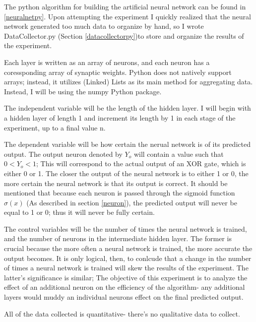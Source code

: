 \documentclass[12pt]{article}
\begin{document}
        The python algorithm for building the artificial neural network can be found in \ref{neuralnetpy}. Upon attempting the experiment I quickly realized that the neural network generated too much data to organize by hand, so I wrote DataCollector.py (Section \ref{datacollectorpy})to store and organize the results of the experiment.
        
        Each layer is written as an array of neurons, and each neuron has a coressponding array of synaptic weights. Python does not natively support arrays; instead, it utilizes (Linked) Lists as its main method for aggregating data. Instead, I will be using the numpy Python package.

        The independent variable will be the length of the hidden layer. I will begin with a hidden layer of length 1 and increment its length by 1 in each stage of the experiment, up to a final value n.
        
        The dependent variable will be how certain the nerual network is of its predicted output. The output neuron denoted by \({Y_o}\) will contain a value such that \(0 < Y_o < 1\); This will correspond to the actual output of an XOR gate, which is either 0 or 1. The closer the output of the neural network is to either 1 or 0, the more certain the neural network is that its output is correct. It should be mentioned that because each neuron is passed through the sigmoid function \(\sigma(x)\) (As described in section \ref{neuron}), the predicted output will never be equal to 1 or 0; thus it will never be fully certain.

        The control variables will be the number of times the neural network is trained, and the number of neurons in the intermediate hidden layer. The former is crucial because the more often a neural network is trained, the more accurate the output becomes. It is only logical, then, to conlcude that a change in the number of times a neural network is trained will skew the results of the experiment. The latter's significance is similar; The objective of this experiment is to analyze the effect of an additional neuron on the efficiency of the algorithm- any additional layers would muddy an individual neurons effect on the final predicted output.

        All of the data collected is quantitative- there's no qualitative data to collect.

\end{document}
